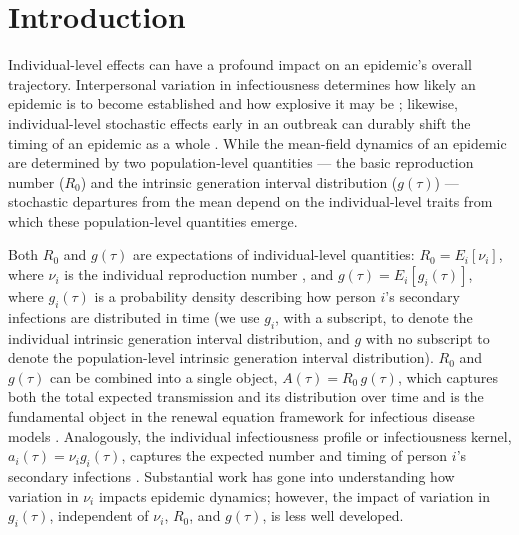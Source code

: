 \clearpage
\section{Introduction}

Individual-level effects can have a profound impact on an epidemic's overall trajectory. Interpersonal variation in infectiousness determines how likely an epidemic is to become established and how explosive it may be \citep{lloyd-smith_superspreading_2005}; likewise, individual-level stochastic effects early in an outbreak can durably shift the timing of an epidemic as a whole \citep{morris_computation_2024}. While the mean-field dynamics of an epidemic are determined by two population-level quantities --- the basic reproduction number ($R_0$) and the intrinsic generation interval distribution ($g(\tau)$) \citep{wallinga_how_2007} --- stochastic departures from the mean depend on the individual-level traits from which these population-level quantities emerge. 

Both $R_0$ and $g(\tau)$ are expectations of individual-level quantities: $R_0 = E_i[\nu_i]$, where $\nu_i$ is the individual reproduction number \citep{lloyd-smith_superspreading_2005}, and $g(\tau) = E_i[g_i(\tau)]$, where $g_i(\tau)$ is a probability density describing how person $i$'s secondary infections are distributed in time (we use $g_i$, with a subscript, to denote the individual intrinsic generation interval distribution, and $g$ with no subscript to denote the population-level intrinsic generation interval distribution). $R_0$ and $g(\tau)$ can be combined into a single object, $A(\tau) = R_0\, g(\tau)$, which captures both the total expected transmission and its distribution over time and is the fundamental object in the renewal equation framework for infectious disease models \citep{breda_formulation_2012}. Analogously, the individual infectiousness profile or infectiousness kernel, $a_i(\tau) = \nu_i g_i(\tau)$, captures the expected number and timing of person $i$'s secondary infections \citep{champredon_intrinsic_2015, svensson_note_2007}. Substantial work has gone into understanding how variation in $\nu_i$ impacts epidemic dynamics; however, the impact of variation in $g_i(\tau)$, independent of $\nu_i$, $R_0$, and $g(\tau)$, is less well developed.  



